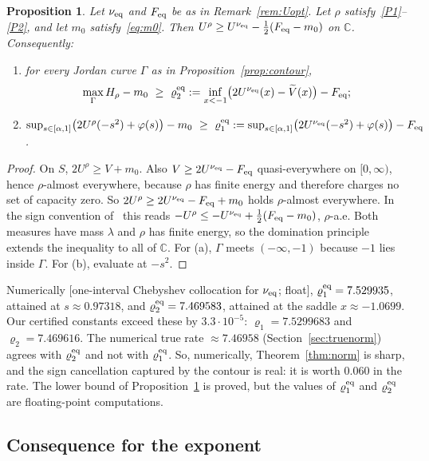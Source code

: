 \documentclass[11pt]{article}
\newtheorem{proposition}{Proposition}
\theoremstyle{remark}
\newcommand{\C}{\mathbb{C}}
\newcommand{\Vt}{\widetilde{V}}
\begin{document}
\begin{proposition}\label{prop:limit}
Let $\nu_{\rm eq}$ and $F_{\rm eq}$ be as in Remark~\ref{rem:Uopt}. Let $\rho$ satisfy~\ref{P1}--\ref{P2}, and let $m_0$ satisfy~\eqref{eq:m0}. Then $U^\rho\ge U^{\nu_{\rm eq}}-\frac12(F_{\rm eq}-m_0)$ on $\C$. Consequently:
\begin{enumerate}[label=(\alph*)]
\item for every Jordan curve $\Gamma$ as in Proposition~\ref{prop:contour},
\[
\max_\Gamma H_\rho-m_0\ \ge\ \varrho_2^{\rm eq}:=\inf_{x<-1}\bigl(2U^{\nu_{\rm eq}}(x)-\Vt(x)\bigr)-F_{\rm eq};
\]
\item $\sup_{s\in[\alpha,1]}\bigl(2U^\rho(-s^2)+\varphi(s)\bigr)-m_0\ \ge\ \varrho_1^{\rm eq}:=\sup_{s\in[\alpha,1]}\bigl(2U^{\nu_{\rm eq}}(-s^2)+\varphi(s)\bigr)-F_{\rm eq}$.
\end{enumerate}
\end{proposition}

\begin{proof}
On $S$, $2U^\rho\ge V+m_0$. Also $V\ge2U^{\nu_{\rm eq}}-F_{\rm eq}$ quasi-everywhere on $[0,\infty)$, hence $\rho$-almost everywhere, because $\rho$ has finite energy and therefore charges no set of capacity zero. So $2U^\rho\ge2U^{\nu_{\rm eq}}-F_{\rm eq}+m_0$ holds $\rho$-almost everywhere. In the sign convention of~\cite{ST} this reads $-U^\rho\le-U^{\nu_{\rm eq}}+\frac12(F_{\rm eq}-m_0)$, $\rho$-a.e. Both measures have mass $\lambda$ and $\rho$ has finite energy, so the domination principle~\cite[Thm.~II.3.2]{ST} extends the inequality to all of $\C$. For (a), $\Gamma$ meets $(-\infty,-1)$ because $-1$ lies inside $\Gamma$. For (b), evaluate at $-s^2$.
\end{proof}

Numerically [one-interval Chebyshev collocation for $\nu_{\rm eq}$; float], $\varrho_1^{\rm eq}=7.529935$, attained at $s\approx0.97318$, and $\varrho_2^{\rm eq}=7.469583$, attained at the saddle $x\approx-1.0699$. Our certified constants exceed these by $3.3\cdot10^{-5}$: $\varrho_1=7.5299683$ and $\varrho_2=7.469616$. The numerical true rate $\approx7.46958$ (Section~\ref{sec:truenorm}) agrees with $\varrho_2^{\rm eq}$ and not with $\varrho_1^{\rm eq}$. So, numerically, Theorem~\ref{thm:norm} is sharp, and the sign cancellation captured by the contour is real: it is worth $0.060$ in the rate. The lower bound of Proposition~\ref{prop:limit} is proved, but the values of $\varrho_1^{\rm eq}$ and $\varrho_2^{\rm eq}$ are floating-point computations.

\subsection{Consequence for the exponent}
\end{document}
